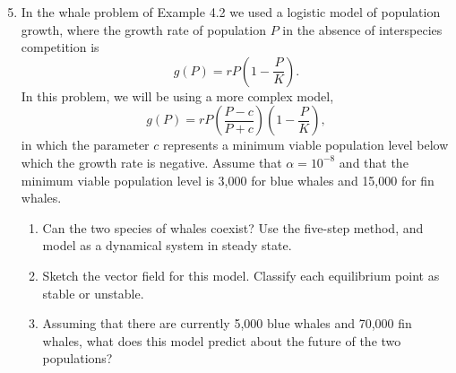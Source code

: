\documentclass[12pt, oneside]{book}
\newenvironment{solution}{\textit{Solution.}}
\newcommand{\sol}[1]{
    \begin{customframedproof}[linecolor=orangehdx!75,]
        \begin{solution}
        #1
        \end{solution}
    \end{customframedproof}
}
\begin{document}
\begin{enumerate}
    \setcounter{enumi}{4}
    \item In the whale problem of Example 4.2 we used a logistic model of population growth, where the growth rate of population \(P\) in the absence of interspecies competition is
    \[
        g(P) = rP\left(1 - \frac{P}{K}\right).
    \]  
    In this problem, we will be using a more complex model,
    \[
        g(P) = rP\left(\frac{P - c}{P + c}\right)\left(1 - \frac{P}{K}\right),
    \]
    in which the parameter \(c\) represents a minimum viable population level below which the growth rate is negative. Assume that \(\alpha = 10^{-8}\) and that the minimum viable population level is 3,000 for blue whales and 15,000 for fin whales.
    \begin{enumerate}
        \item Can the two species of whales coexist? Use the five-step method, and model as a dynamical system in steady state.
        \item Sketch the vector field for this model. Classify each equilibrium point as stable or unstable.
        \item Assuming that there are currently 5,000 blue whales and 70,000 fin whales, what does this model predict about the future of the two populations?
    \end{enumerate}
\end{enumerate}
\end{document}
